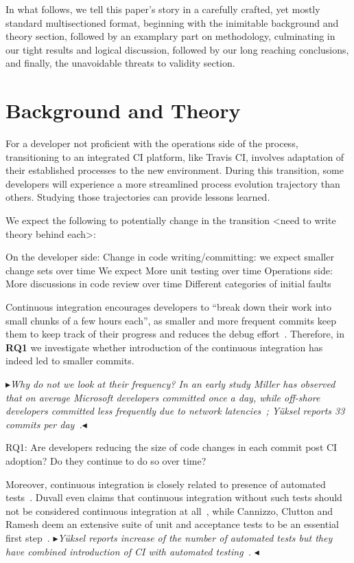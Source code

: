 \documentclass[conference]{IEEEtran}
\newcommand{\nnbb}[2]{
    \fbox{\bfseries\sffamily\scriptsize#1}
    {\sf\small$\blacktriangleright$\textit{#2}$\blacktriangleleft$}
   }
\newcommand{\as}[1]{\nnbb{Alexander}{#1}}
\begin{document}
In what follows, we tell this paper's story in a carefully crafted, yet mostly standard multisectioned format, beginning with the inimitable background and theory section, followed by an examplary part on methodology, culminating in our tight results and logical discussion, followed by our long reaching conclusions, and finally, the unavoidable threats to validity section.


\section{Background and Theory}

For a developer not proficient with the operations side of the process, transitioning to an integrated CI platform, like Travis CI, involves adaptation of their established processes to the new environment. During this transition, some developers will experience a more streamlined process evolution trajectory than others. Studying those trajectories can provide lessons learned.


We expect the following to potentially change in the transition <need to write theory behind each>:

On the developer side:
Change in code writing/committing: we expect smaller change sets over time
We expect More unit testing over time
Operations side:
More discussions in code review over time
Different categories of initial faults

Continuous integration encourages developers to ``break down their work into small chunks of a few hours each'', as smaller and more frequent commits keep them to keep track of their progress and reduces the debug effort~\cite{Fowler,Duvall}. %
Therefore, in \textbf{RQ1} we investigate whether introduction of the continuous integration has indeed led to smaller commits.
\as{Why do not we look at their frequency? In an early study Miller has observed that on average Microsoft developers committed once a day, while off-shore developers committed less frequently due to network latencies~\cite{Miller}; Y\"{u}ksel reports 33 commits per day~\cite{Yuksel}.}

RQ1: Are developers reducing the size of code changes in each commit post CI adoption? Do they continue to do so over time?

Moreover, continuous integration is closely related to presence of automated tests~\cite{Fowler}. Duvall even claims that continuous integration without such tests should not be considered continuous integration at all~\cite{Duvall}, while Cannizzo, Clutton and Ramesh deem an extensive suite of unit and acceptance tests to be an essential first step~\cite{CannizzoCluttonRamesh}. \as{Y\"{u}ksel reports increase of the number of automated tests but they have combined introduction of CI with automated testing~\cite{Yuksel}. }
\end{document}
